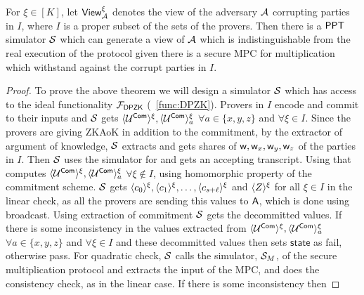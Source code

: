 \begin{lemma}\label{lem:privacy}
	For $\xi\in [K]$, let $\mathsf{View}^{\xi}_{\mathcal{A}}$ denotes the view of the adversary $\mathcal{A}$ corrupting parties in $I$, where $I$ is a proper subset of the sets of the provers. Then there is a $\mathsf{PPT}$ simulator $\mathcal{S}$ which can generate a view of $\mathcal{A}$ which is indistinguishable from the real execution of the protocol given there is a secure MPC for multiplication which withstand against the corrupt parties in $I$. 
\end{lemma}

\begin{proof}
	To prove the above theorem we will design a simulator $\mathcal{S}$ which has access to the ideal functionality $\mathcal{F}_{\mathsf{DPZK}}$ (~\ref{func:DPZK}). Provers in $I$ encode and commit to their inputs and $\mathcal{S}$ gets $\langle{\mathcal{U}^{\mathsf{Com}}}\rangle^\xi, \langle{\mathcal{U}^{\mathsf{Com}}}\rangle^\xi_a$ $\forall a\in\{x,y,z\}$ and $\forall \xi \in I$. Since the provers are giving ZKAoK in addition to the commitment, by the extractor of argument of knowledge, $\mathcal{S}$ extracts and gets shares of $\mathsf{w}, \mathsf{w}_x,\mathsf{w}_y,\mathsf{w}_z$ of the parties in $I$. 
	Then $\mathcal{S}$ uses the simulator for \name and gets an accepting transcript. Using that computes $\langle{\mathcal{U}^{\mathsf{Com}}}\rangle^\xi, \langle{\mathcal{U}^{\mathsf{Com}}}\rangle^\xi_a$ $\forall \xi\notin I$, using homomorphic property of the commitment scheme.
	$\mathcal{S}$ gets $\langle{c_0}\rangle^\xi, \langle{c_1}\rangle^\xi, \ldots, \langle{c_{s+\ell}}\rangle^\xi$ and $\langle{Z}\rangle^\xi$ for all $\xi\in I$ in the linear check, as all the provers are sending this values to $\mathsf{A}$, which is done using broadcast. Using extraction of commitment $\mathcal{S}$ gets the decommitted values. If there is some inconsistency in the values extracted from $\langle{\mathcal{U}^{\mathsf{Com}}}\rangle^\xi, \langle{\mathcal{U}^{\mathsf{Com}}}\rangle^\xi_a$ $\forall a\in\{x,y,z\}$ and $\forall \xi \in I$ and these decommitted values then
	sets $\mathsf{state}$ as fail, otherwise pass.
	For quadratic check, $\mathcal{S}$ calls the simulator, $\mathcal{S}_M$, of the secure multiplication protocol and extracts the input of the MPC, and does the consistency check, as in the linear case. If there is some inconsistency then 

\end{proof}
